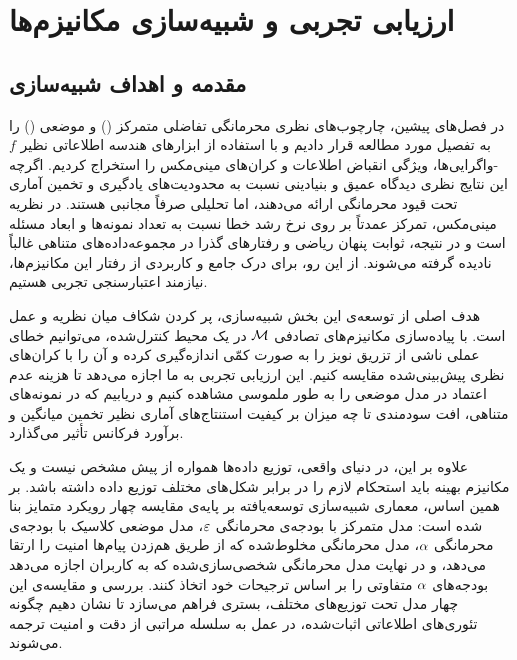 \chapter{ارزیابی تجربی و شبیه‌سازی مکانیزم‌ها}
\label{ch:simulation}

\section{مقدمه و اهداف شبیه‌سازی}
\label{sec:sim-intro}

در فصل‌های پیشین، چارچوب‌های نظری محرمانگی تفاضلی متمرکز () و موضعی () را به تفصیل مورد مطالعه قرار دادیم و با استفاده از ابزارهای هندسه اطلاعاتی نظیر $f$-واگرایی‌ها، ویژگی انقباض اطلاعات و کران‌های مینی‌مکس را استخراج کردیم. اگرچه این نتایج نظری دیدگاه عمیق و بنیادینی نسبت به محدودیت‌های یادگیری و تخمین آماری تحت قیود محرمانگی ارائه می‌دهند، اما تحلیلی صرفاً مجانبی هستند. در نظریه مینی‌مکس، تمرکز عمدتاً بر روی نرخ رشد خطا نسبت به تعداد نمونه‌ها و ابعاد مسئله است و در نتیجه، ثوابت پنهان ریاضی و رفتارهای گذرا در مجموعه‌داده‌های متناهی غالباً نادیده گرفته می‌شوند. از این رو، برای درک جامع و کاربردی از رفتار این مکانیزم‌ها، نیازمند اعتبارسنجی تجربی هستیم.

هدف اصلی از توسعه‌ی این بخش شبیه‌سازی، پر کردن شکاف میان نظریه و عمل است. با پیاده‌سازی مکانیزم‌های تصادفی $\mech$ در یک محیط کنترل‌شده، می‌توانیم خطای عملی ناشی از تزریق نویز را به صورت کمّی اندازه‌گیری کرده و آن را با کران‌های نظری پیش‌بینی‌شده مقایسه کنیم. این ارزیابی تجربی به ما اجازه می‌دهد تا هزینه عدم اعتماد در مدل موضعی را به طور ملموسی مشاهده کنیم و دریابیم که در نمونه‌های متناهی، افت سودمندی تا چه میزان بر کیفیت استنتاج‌های آماری نظیر تخمین میانگین و برآورد فرکانس تأثیر می‌گذارد.

علاوه بر این، در دنیای واقعی، توزیع داده‌ها همواره از پیش مشخص نیست و یک مکانیزم بهینه باید استحکام لازم را در برابر شکل‌های مختلف توزیع داده داشته باشد. بر همین اساس، معماری شبیه‌سازی توسعه‌یافته بر پایه‌ی مقایسه چهار رویکرد متمایز بنا شده است: مدل متمرکز با بودجه‌ی محرمانگی $\varepsilon$، مدل موضعی کلاسیک با بودجه‌ی محرمانگی $\alpha$، مدل محرمانگی مخلوط‌شده که از طریق هم‌زدن پیام‌ها امنیت را ارتقا می‌دهد، و در نهایت مدل محرمانگی شخصی‌سازی‌شده که به کاربران اجازه می‌دهد بودجه‌های $\alpha$ متفاوتی را بر اساس ترجیحات خود اتخاذ کنند. بررسی و مقایسه‌ی این چهار مدل تحت توزیع‌های مختلف، بستری فراهم می‌سازد تا نشان دهیم چگونه تئوری‌های اطلاعاتی اثبات‌شده، در عمل به سلسله مراتبی از دقت و امنیت ترجمه می‌شوند.

